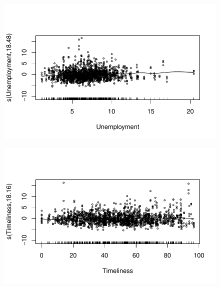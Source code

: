 \documentclass[
  letterpaper,
  DIV=11,
  numbers=noendperiod]{scrartcl}
\begin{document}
\begin{figure}[H]

{\centering \includegraphics{Group34Coursework_files/figure-pdf/unnamed-chunk-9-7.pdf}

}

\end{figure}

\begin{figure}[H]

{\centering \includegraphics{Group34Coursework_files/figure-pdf/unnamed-chunk-9-8.pdf}

}

\end{figure}
\end{document}
